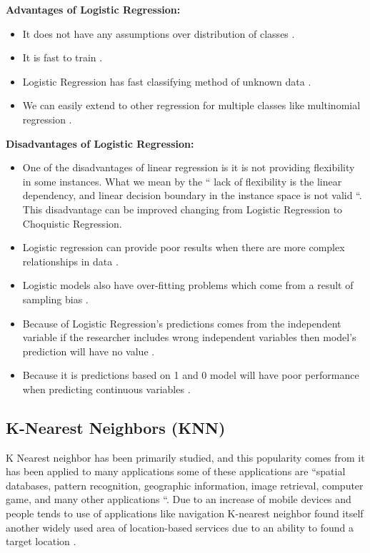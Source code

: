 \documentclass[sigconf]{acmart}
\begin{document}
\textbf{Advantages of Logistic Regression:}
\begin{itemize}
\item It does not have any assumptions over distribution of classes \cite{www-washington}.
\item It is fast to train \cite{www-washington}.
\item Logistic Regression has fast classifying method of unknown data \cite{www-washington}.
\item We can easily extend to other regression for multiple classes like multinomial regression \cite{www-washington}. 
\end{itemize}

\textbf{Disadvantages of Logistic Regression:}

\begin{itemize}
\item One of the disadvantages of linear regression is it is not providing flexibility in some instances. What we mean by the `` lack of flexibility is the linear dependency, and linear decision boundary in the instance space is not valid \cite{www-old.cs}``. This disadvantage can be improved changing from Logistic Regression to Choquistic Regression\cite{www-old.cs}.
\item Logistic regression can provide poor results when there are more complex relationships in data \cite{www-elitedatascience}.
\item Logistic models also have over-fitting problems which come from a result of sampling bias \cite{www-classroom}.
\item Because of Logistic Regression's predictions comes from the independent variable if the researcher includes wrong independent variables then model's prediction will have no value \cite{www-classroom}.
\item Because it is predictions based on 1 and 0 model will have poor performance when predicting continuous variables \cite{www-classroom}. 
\end{itemize}


\subsection{K-Nearest Neighbors (KNN)}
K Nearest neighbor has been primarily studied, and this popularity comes from it has been applied to many applications some of these applications are ``spatial databases, pattern recognition, geographic information, image retrieval, computer game, and many other applications \cite{Lee2017-knn}``. Due to an increase of mobile devices and people tends to use of applications like navigation K-nearest neighbor found itself another widely used area of location-based services due to an ability to found a target location \cite{Lee2017-knn}. 
\end{document}
